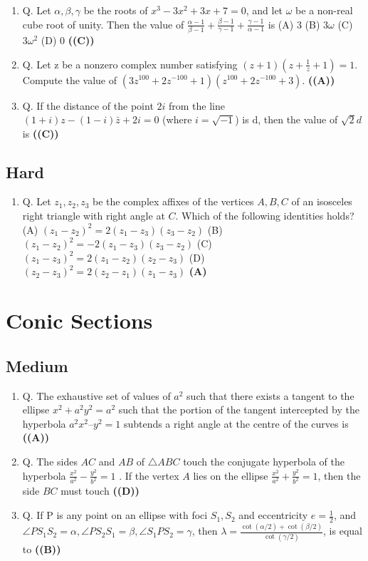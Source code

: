 \documentclass{article}
\begin{document}
\begin{enumerate}
\item Q. Let $\alpha, \beta, \gamma$ be the roots of $x^3 - 3x^2 + 3x + 7 = 0$, and let $\omega$ be a non-real cube root of unity. Then the value of $\frac{\alpha-1}{\beta-1} + \frac{\beta-1}{\gamma-1} + \frac{\gamma-1}{\alpha-1}$ is (A) 3 (B) $3\omega$ (C) $3\omega^2$ (D) 0 \hfill \textbf{((C))}
\item Q. Let z be a nonzero complex number satisfying $(z + 1)\left(z + \frac{1}{z} + 1\right) = 1$. Compute the value of $(3z^{100} + 2z^{-100} + 1)(z^{100} + 2z^{-100} + 3)$. \hfill \textbf{((A))}
\item Q. If the distance of the point $2i$ from the line $(1 + i)z - (1 - i)\bar{z} + 2i = 0$ (where $i = \sqrt{-1}$) is d, then the value of $\sqrt{2}d$ is \hfill \textbf{((C))}
\end{enumerate}
\subsection{Hard}
\begin{enumerate}
\item Q. Let $z_1, z_2, z_3$ be the complex affixes of the vertices $A, B, C$ of an isosceles right triangle with right angle at $C$. Which of the following identities holds?
(A) $(z_1-z_2)^2 = 2(z_1-z_3) (z_3-z_2)$
(B) $(z_1-z_2)^2 = -2(z_1-z_3) (z_3-z_2)$
(C) $(z_1-z_3)^2 = 2(z_1-z_2) (z_2-z_3)$
(D) $(z_2-z_3)^2 = 2 (z_2-z_1) (z_1-z_3)$ \hfill \textbf{(A)}
\end{enumerate}
\section{Conic Sections}
\subsection{Medium}
\begin{enumerate}
\item Q. The exhaustive set of values of $a^2$ such that there exists a tangent to the ellipse $x^2 + a^2y^2 = a^2$ such that the portion of the tangent intercepted by the hyperbola $a^2x^2 – y^2 = 1$ subtends a right angle at the centre of the curves is \hfill \textbf{((A))}
\item Q. The sides $AC$ and $AB$ of $\triangle ABC$ touch the conjugate hyperbola of the hyperbola $\frac{x^2}{a^2} - \frac{y^2}{b^2} = 1$ . If the vertex $A$ lies on the ellipse $\frac{x^2}{a^2} + \frac{y^2}{b^2} = 1$, then the side $BC$ must touch \hfill \textbf{((D))}
\item Q. If P is any point on an ellipse with foci $S_1, S_2$ and eccentricity $e = \frac{1}{2}$, and $\angle PS_1S_2 = \alpha, \angle PS_2S_1 = \beta, \angle S_1 PS_2 = \gamma$, then $\lambda = \frac{\cot(\alpha/2) + \cot(\beta/2)}{\cot(\gamma/2)}$, is equal to \hfill \textbf{((B))}
\end{enumerate}
\end{document}
